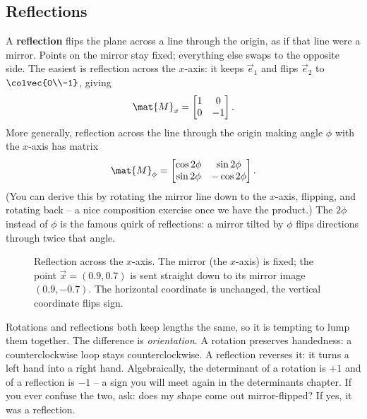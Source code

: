 \subsection{Reflections}
\label{ch05:reflections}

A \textbf{reflection} flips the plane across a line through the origin, as if that
line were a mirror. Points on the mirror stay fixed; everything else swaps to the
opposite side. The easiest is reflection across the $x$-axis: it keeps
$\vec{e}_1$ and flips $\vec{e}_2$ to $\colvec{0\\-1}$, giving
\[
  \mat{M}_x = \begin{bmatrix} 1 & 0 \\ 0 & -1 \end{bmatrix}.
\]
More generally, reflection across the line through the origin making angle
$\phi$ with the $x$-axis has matrix
\[
  \mat{M}_\phi = \begin{bmatrix} \cos 2\phi & \sin 2\phi \\ \sin 2\phi & -\cos 2\phi \end{bmatrix}.
\]
(You can derive this by rotating the mirror line down to the $x$-axis, flipping,
and rotating back -- a nice composition exercise once we have the product.) The
$2\phi$ instead of $\phi$ is the famous quirk of reflections: a mirror tilted by
$\phi$ flips directions through twice that angle.

\begin{figure}[H]
\centering
{}
\caption{Reflection across the $x$-axis. The mirror (the $x$-axis) is fixed; the
point $\vec{x}=(0.9,0.7)$ is sent straight down to its mirror image $(0.9,-0.7)$.
The horizontal coordinate is unchanged, the vertical coordinate flips sign.}
\label{ch05:fig-reflection}
\end{figure}

\begin{trapbox}
Rotations and reflections both keep lengths the same, so it is tempting to lump
them together. The difference is \emph{orientation}. A rotation preserves
handedness: a counterclockwise loop stays counterclockwise. A reflection reverses
it: it turns a left hand into a right hand. Algebraically, the determinant of a
rotation is $+1$ and of a reflection is $-1$ -- a sign you will meet again in the
determinants chapter. If you ever confuse the two, ask: does my shape come out
mirror-flipped? If yes, it was a reflection.
\end{trapbox}

